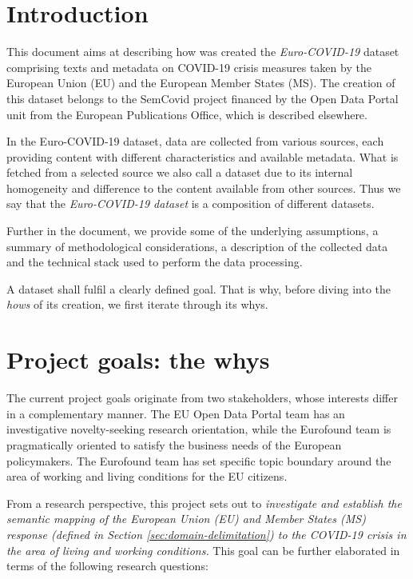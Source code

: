 
\section{Introduction}

This document aims at describing how was created the \textit{Euro-COVID-19} dataset comprising texts and metadata on COVID-19 crisis measures taken by the European Union (EU) and the European Member States (MS). The creation of this dataset belongs to the SemCovid project financed by the Open Data Portal unit from the European Publications Office, which is described elsewhere. 

In the Euro-COVID-19 dataset, data are collected from various sources, each providing content with different characteristics and available metadata. What is fetched from a selected source we also call a dataset due to its internal homogeneity and difference to the content available from other sources. Thus we say that the \textit{Euro-COVID-19 dataset} is a composition of different datasets.

Further in the document, we provide some of the underlying assumptions, a summary of methodological considerations, a description of the collected data and the technical stack used to perform the data processing. 

A dataset shall fulfil a clearly defined goal. That is why, before diving into the \textit{hows} of its creation, we first iterate through its whys.

\section{Project goals: the whys}
\label{sec:goals}

The current project goals originate from two stakeholders, whose interests differ in a complementary manner. The EU Open Data Portal team has an investigative novelty-seeking research orientation, while the Eurofound team is pragmatically oriented to satisfy the business needs of the European policymakers. The Eurofound team has set specific topic boundary around the area of working and living conditions for the EU citizens.

From a research perspective, this project sets out to \textit{investigate and establish the semantic mapping of the European Union (EU) and Member States (MS) response (defined in Section \ref{sec:domain-delimitation}) to the COVID-19 crisis in the area of living and working conditions.} This goal can be further elaborated in terms of the following research questions:

